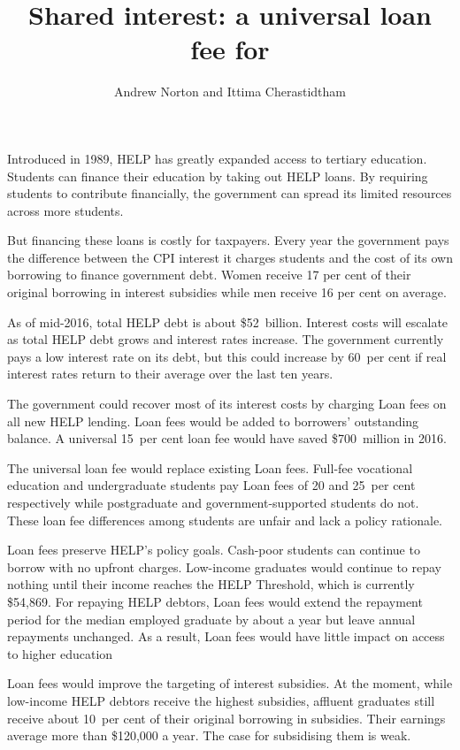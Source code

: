 \documentclass{grattan}
\title{Shared interest: a universal loan fee for \abbrev{HELP}}  %
\author{Andrew Norton and Ittima Cherastidtham}
\begin{document}
\setlength{\overviewExtra}{-3pt}
\begin{overview}
Introduced in 1989, \gls{HELP} has greatly expanded access to tertiary education.
Students can finance their education by taking out \gls{HELP} loans.
By requiring students to contribute financially, the government can spread its limited resources across more students.

But financing these loans is costly for taxpayers.
Every year the government pays the difference between the \gls{CPI} interest it charges students and the cost of its own borrowing to finance government debt. 
Women receive 17 per cent of their original borrowing in interest subsidies while men receive 16 per cent on average.

As of mid-2016, total \gls{HELP} debt is about \$52~billion.
Interest costs will escalate as total \gls{HELP} debt grows and interest rates increase.
The government currently pays a low interest rate on its debt, but this could increase by 60~per cent if real interest rates return to their average over the last ten years. 

The government could recover most of its interest costs by charging \gls{Loan fees} on all new \gls{HELP} lending. Loan fees would be added to borrowers' outstanding balance.
A universal 15~per cent loan fee would have saved \$700~million in 2016.

The universal loan fee would replace existing \gls{Loan fees}.
Full-fee vocational education and undergraduate students pay \gls{Loan fees} of 20 and 25~per cent respectively while postgraduate and government-supported students do not.
These loan fee differences among students are unfair and lack a policy rationale.

\Gls{Loan fees} preserve \gls{HELP}'s policy goals.
Cash-poor students can continue to borrow with no upfront charges.
Low-income graduates would continue to repay nothing until their income reaches the \gls{HELP} \gls{Threshold}, which is currently \$54,869.
For repaying \gls{HELP} debtors, \gls{Loan fees} would extend the repayment period for the median employed graduate by about a year but leave annual repayments unchanged. As a result, \gls{Loan fees} would have little impact on access to higher education

Loan fees would improve the targeting of interest subsidies.
At the moment, while low-income \gls{HELP} debtors receive the highest subsidies, affluent graduates still receive about 10~per cent of their original borrowing in subsidies.
Their earnings average more than \$120,000 a year.
The case for subsidising them is weak.


\end{overview}
\end{document}
